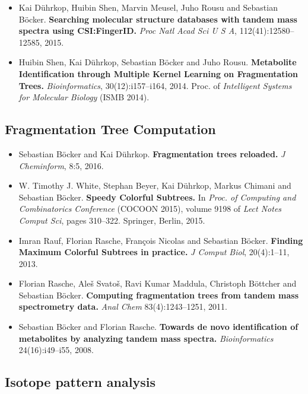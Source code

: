 \documentclass[letterpaper,10pt,openany,oneside]{sphinxmanual}
\begin{document}
\begin{itemize}
\item Kai Dührkop, Huibin Shen, Marvin Meusel, Juho Rousu and Sebastian Böcker.
\textbf{Searching molecular structure databases with tandem mass spectra using CSI:FingerID.}
\emph{Proc Natl Acad Sci U S A}, 112(41):12580--12585, 2015. 

\item Huibin Shen, Kai Dührkop, Sebastian Böcker and Juho Rousu.
\textbf{Metabolite Identification through Multiple Kernel Learning on Fragmentation Trees.}
\emph{Bioinformatics}, 30(12):i157--i164, 2014. Proc. of \emph{Intelligent Systems for Molecular Biology} (ISMB 2014).
\end{itemize}

\subsection{Fragmentation Tree Computation}
\label{introduction:fragmentation-tree-computation}

\begin{itemize}
\item Sebastian Böcker and Kai Dührkop.
\textbf{Fragmentation trees reloaded.}
\emph{J Cheminform}, 8:5, 2016.

\item W. Timothy J. White, Stephan Beyer, Kai Dührkop, Markus Chimani and Sebastian Böcker.
\textbf{Speedy Colorful Subtrees.}
In \emph{Proc. of Computing and Combinatorics Conference} (COCOON 2015), volume 9198 of \emph{Lect Notes Comput Sci}, pages 310--322. Springer, Berlin, 2015.

\item Imran Rauf, Florian Rasche, François Nicolas and Sebastian Böcker.
\textbf{Finding Maximum Colorful Subtrees in practice.}
\emph{J Comput Biol}, 20(4):1--11, 2013.

\item Florian Rasche, Aleš Svatoš, Ravi Kumar Maddula, Christoph Böttcher and Sebastian Böcker.
\textbf{Computing fragmentation trees from tandem mass spectrometry data.}
\emph{Anal Chem} 83(4):1243–1251, 2011.

\item Sebastian Böcker and Florian Rasche.
\textbf{Towards de novo identification of metabolites by analyzing tandem mass spectra.}
\emph{Bioinformatics} 24(16):i49--i55, 2008.
\end{itemize}


\subsection{Isotope pattern analysis}
\label{introduction:isotope-pattern-analysis}
\end{document}
